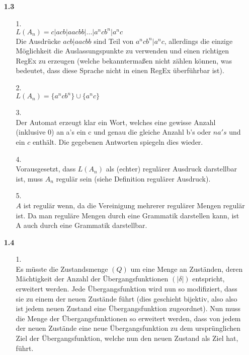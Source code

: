\documentclass[a4paper,11pt,fleqn]{scrartcl}
\title{\titleinfo}
\author{\authorinfo}
\begin{document}
\maketitle
	\begin{enumerate}
		\item[\textbf{1.3}]
		\begin{enumerate}
			\item[1.]\quad \\
			$L(A_n) = c| acb|aacbb|...|a^ncb^n|a^nc$ \\
			Die Ausdrücke $acb|aacbb$ sind Teil von $a^ncb^n|a^nc$, allerdings die einzige 
			Möglichkeit die Auslassungspunkte zu verwenden und einen richtigen RegEx zu erzeugen
			(welche bekanntermaßen nicht zählen können, was bedeutet, dass diese Sprache nicht in 
			einen RegEx überführbar ist).
			
			\item[2.]\quad \\
			$L(A_n) = \{a^ncb^n\} \cup \{a^nc\}$
			
			\item[3.]\quad \\
			Der Automat erzeugt klar ein Wort, welches eine gewisse Anzahl (inklusive 0) an a's ein c 
			und genau die gleiche Anzahl b's oder $n a's$ und ein $c$ enthält.
			Die gegebenen Antworten spiegeln dies wieder.
			
			\item[4.]\quad \\
			Vorausgesetzt, dass $L(A_n)$ als (echter) regulärer Ausdruck darstellbar ist, muss $A_n$ 
			regulär sein (siehe Definition regulärer Ausdruck).
			
			\item[5.]\quad \\
			$A$ ist regulär wenn, da die Vereinigung mehrerer regulärer Mengen regulär ist.
			Da man reguläre Mengen durch eine Grammatik darstellen kann, ist A auch durch eine 
			Grammatik darstellbar. \\		
		\end{enumerate}
		
		\item[\textbf{1.4}]
		\begin{enumerate}
			\item[1.]\quad \\
				Es müsste die Zustandsmenge $(Q)$ um eine Menge an Zuständen, deren Mächtigkeit der 
				Anzahl der Übergangsfunktionen $(|\delta|)$ entspricht, erweitert werden. Jede 
				Übergangsfunktion wird nun so modifiziert, dass sie zu einem der neuen Zustände führt
				(dies geschieht bijektiv, also also ist jedem neuen Zustand eine Übergangsfunktion 
				zugeordnet). Nun muss die Menge der Übergangsfunktionen so erweitert werden, dass
				von jedem der neuen Zustände eine neue Übergangsfunktion zu dem ursprünglichen Ziel 
				der Übergangsfunktion, welche nun den neuen Zustand als Ziel hat, führt.
			

\end{enumerate}
\end{enumerate}
\end{document}
